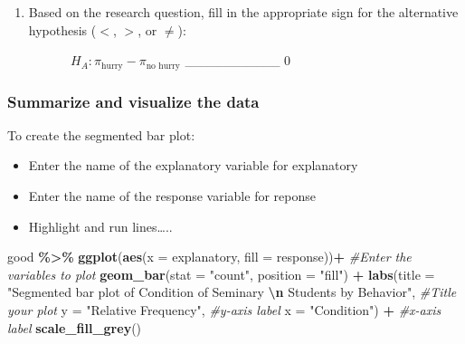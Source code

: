 \documentclass[
]{report}
\newenvironment{Shaded}{\begin{snugshade}}{\end{snugshade}}
\newcommand{\AttributeTok}[1]{\textcolor[rgb]{0.13,0.29,0.53}{#1}}
\newcommand{\CommentTok}[1]{\textcolor[rgb]{0.56,0.35,0.01}{\textit{#1}}}
\newcommand{\FunctionTok}[1]{\textcolor[rgb]{0.13,0.29,0.53}{\textbf{#1}}}
\newcommand{\NormalTok}[1]{#1}
\newcommand{\SpecialCharTok}[1]{\textcolor[rgb]{0.81,0.36,0.00}{\textbf{#1}}}
\newcommand{\StringTok}[1]{\textcolor[rgb]{0.31,0.60,0.02}{#1}}
\providecommand{\tightlist}{%
  \setlength{\itemsep}{0pt}\setlength{\parskip}{0pt}}
\begin{document}
\vspace{0.4in}

\begin{enumerate}
\def\labelenumi{\arabic{enumi}.}
\setcounter{enumi}{1}
\tightlist
\item
  Based on the research question, fill in the appropriate sign for the alternative hypothesis (\(<\), \(>\), or \(\neq\)):
  \vspace{2mm}
\end{enumerate}

~~~~~~~~~~\(H_A: \pi_{\text{hurry}} -\pi_{\text{no hurry}}\) \_\_\_\_\_\_\_\_\_\_ 0

\subsubsection*{Summarize and visualize the data}\label{summarize-and-visualize-the-data-3}

To create the segmented bar plot:

\begin{itemize}
\item
  Enter the name of the explanatory variable for explanatory
\item
  Enter the name of the response variable for reponse
\item
  Highlight and run lines\ldots..
\end{itemize}

\begin{Shaded}
\begin{Highlighting}[]
\NormalTok{good }\SpecialCharTok{\%\textgreater{}\%}
  \FunctionTok{ggplot}\NormalTok{(}\FunctionTok{aes}\NormalTok{(}\AttributeTok{x =}\NormalTok{ explanatory, }\AttributeTok{fill =}\NormalTok{ response))}\SpecialCharTok{+} \CommentTok{\#Enter the variables to plot}
  \FunctionTok{geom\_bar}\NormalTok{(}\AttributeTok{stat =} \StringTok{"count"}\NormalTok{, }\AttributeTok{position =} \StringTok{"fill"}\NormalTok{) }\SpecialCharTok{+}
  \FunctionTok{labs}\NormalTok{(}\AttributeTok{title =} \StringTok{"Segmented bar plot of Condition of Seminary }\SpecialCharTok{\textbackslash{}n}\StringTok{ Students by Behavior"}\NormalTok{, }\CommentTok{\#Title your plot}
       \AttributeTok{y =} \StringTok{"Relative Frequency"}\NormalTok{, }\CommentTok{\#y{-}axis label}
       \AttributeTok{x =} \StringTok{"Condition"}\NormalTok{) }\SpecialCharTok{+} \CommentTok{\#x{-}axis label}
  \FunctionTok{scale\_fill\_grey}\NormalTok{()}
\end{Highlighting}
\end{Shaded}
\end{document}
